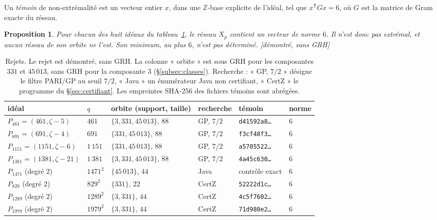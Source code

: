 \documentclass[11pt,a4paper]{amsart}
\theoremstyle{plain}
\newtheorem{proposition}[theoreme]{Proposition}
\theoremstyle{definition}
\numberwithin{equation}{section}
\newcommand{\Z}{\mathbb{Z}}
\newcommand{\st}[1]{\textup{\textsf{\small[#1]}}}
\begin{document}
Un \emph{témoin} de non-extrémalité est un vecteur entier $x$, dans une $\Z$-base explicite de l'idéal, tel que $x^{\mathsf T}Gx=6$, où $G$ est la matrice de Gram exacte du réseau.

\begin{proposition}\label{prop:rejets}
Pour chacun des huit idéaux du tableau~\ref{tab:rejets}, le réseau $X_p$ contient un vecteur de norme $6$. Il n'est donc pas extrémal, et aucun réseau de son orbite ne l'est. Son minimum, au plus $6$, n'est pas déterminé. \st{démontré, sans GRH}
\end{proposition}

\begin{table}[ht]
\caption{Rejets. Le rejet est démontré, sans GRH. La colonne « orbite » est sous GRH pour les composantes $331$ et $45\,013$, sans GRH pour la composante $3$ (\S\ref{subsec:classes}). Recherche : « GP, $7/2$ » désigne le filtre PARI/GP au seuil $7/2$, « Java » un énumérateur Java non certifiant, « CertZ » le programme du \S\ref{sec:certifiant}. Les empreintes SHA-256 des fichiers témoins sont abrégées.}\label{tab:rejets}
\centering\small\setlength{\tabcolsep}{4pt}
\begin{tabular}{llllll}
\toprule
idéal & $q$ & orbite (support, taille) & recherche & témoin & norme \\
\midrule
$P_{461}=(461,\zeta-5)$ & $461$ & $\{3,331,45\,013\}$, $88$ & GP, $7/2$ & \texttt{d41592a8\dots} & $6$ \\
$P_{691}=(691,\zeta-4)$ & $691$ & $\{331,45\,013\}$, $88$ & GP, $7/2$ & \texttt{f3cf48f3\dots} & $6$ \\
$P_{1151}=(1151,\zeta-6)$ & $1\,151$ & $\{331,45\,013\}$, $88$ & GP, $7/2$ & \texttt{a5705522\dots} & $6$ \\
$P_{1381}=(1381,\zeta-21)$ & $1\,381$ & $\{3,331,45\,013\}$, $88$ & GP, $7/2$ & \texttt{4a45c630\dots} & $6$ \\
$P_{1471}$ (degré $2$) & $1471^2$ & $\{45\,013\}$, $44$ & Java & contrôle exact & $6$ \\
$P_{829}$ (degré $2$) & $829^2$ & $\{331\}$, $22$ & CertZ & \texttt{52222d1c\dots} & $6$ \\
$P_{1289}$ (degré $2$) & $1289^2$ & $\{3,331\}$, $44$ & CertZ & \texttt{4c5f7602\dots} & $6$ \\
$P_{1979}$ (degré $2$) & $1979^2$ & $\{3,331\}$, $44$ & CertZ & \texttt{71d980e2\dots} & $6$ \\
\bottomrule
\end{tabular}
\end{table}
\end{document}
